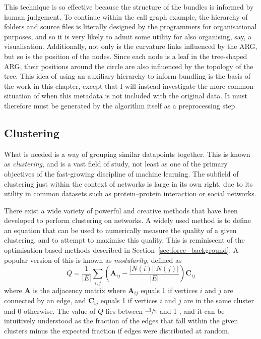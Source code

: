 This technique is so effective because the structure of the bundles is informed by human judgement. To continue within the call graph example, the hierarchy of folders and source files is literally designed by the programmers for organisational purposes, and so it is very likely to admit some utility for also organising, say, a visualisation.
Additionally, not only is the curvature links influenced by the ARG, but so is the position of the nodes. Since each node is a leaf in the tree-shaped ARG, their positions around the circle are also influenced by the topology of the tree.
This idea of using an auxiliary hierarchy to inform bundling is the basis of the work in this chapter, except that I will instead investigate the more common situation of when this metadata is not included with the original data. It must therefore must be generated by the algorithm itself as a preprocessing step.

\subsection{Clustering}
\label{sec:clustering_background}
What is needed is a way of grouping similar datapoints together. This is known as \textit{clustering}, and is a vast field of study, not least as one of the primary objectives of the fast-growing discipline of machine learning. The subfield of clustering just within the context of networks is large in its own right, due to its utility in common datasets such as protein--protein interaction or social networks.

There exist a wide variety of powerful and creative methods that have been developed to perform clustering on networks. A widely used method is to define an equation that can be used to numerically measure the quality of a given clustering, and to attempt to maximise this quality. This is reminiscent of the optimisation-based methods described in Section~\ref{sec:force_background}.
A popular version of this is known as \emph{modularity}, defined as
\begin{equation}
  Q = \frac{1}{|E|}\sum_{i,j}\left(\mathbf{A}_{ij} - \frac{|N(i)||N(j)|}{|E|}\right)\mathbf{C}_{ij}
  \label{eq:modularity}
\end{equation}
where $\mathbf{A}$ is the adjacency matrix where $\mathbf{A}_{ij}$ equals 1 if vertices $i$ and $j$ are connected by an edge, and $\mathbf{C}_{ij}$ equals 1 if vertices $i$ and $j$ are in the same cluster and 0 otherwise.
The value of $Q$ lies between $\text{--}\sfrac{1}{2}$ and 1 \cite{Brandes2007Modularity}, and it can be intuitively understood as the fraction of the edges that fall within the given clusters minus the expected fraction if edges were distributed at random.

